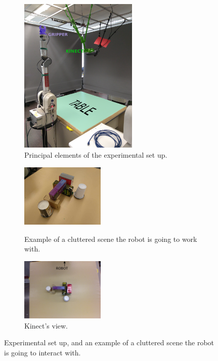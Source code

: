 \begin{figure}[htp]
\centering
\begin{subfigure}[b]{0.4\textwidth}
\includegraphics[height=7.5cm]{Img/set_up/set_up_nice2.png}
\caption{Principal elements of the experimental set up.}\label{fig:setup_}
\end{subfigure}
\qquad \qquad 
\begin{subfigure}[b]{0.4\textwidth}
\centering
\includegraphics[height=3cm]{Img/set_up/example_setup.jpg}
\caption{Example of a cluttered scene the robot is going to work with.}\label{fig:example_scene}
\vspace{2ex}
\includegraphics[height=3cm]{Img/set_up/view_kinect.png}
\caption{Kinect's view.}\label{fig:kinect_view}
\end{subfigure}
\caption{Experimental set up, and an example of a cluttered scene the robot is going to interact with.}
\label{fig:setup}
\end{figure}





